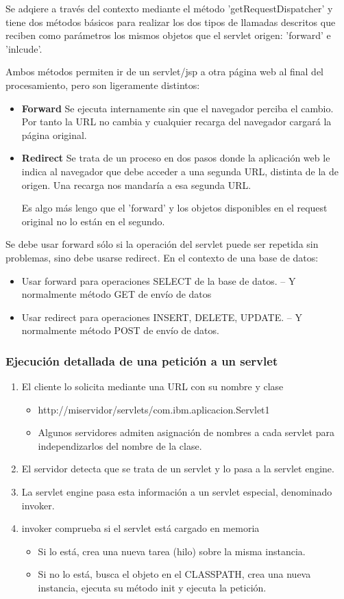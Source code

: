 \documentclass{apuntes}
\begin{document}
Se adqiere a través del contexto mediante el método 'getRequestDispatcher' y tiene dos métodos básicos para realizar los dos tipos de llamadas descritos que reciben como parámetros los mismos objetos que el servlet origen: 'forward' e 'inlcude'.

Ambos métodos permiten ir de un servlet/jsp a otra página web al final del procesamiento, pero son ligeramente distintos:
\begin{itemize}
\item \textbf{Forward}
Se ejecuta internamente sin que el navegador perciba el cambio. Por tanto la URL no cambia y cualquier recarga del navegador cargará la página original.
\item \textbf{Redirect}
Se trata de un proceso en dos pasos donde la aplicación web le indica al navegador que debe acceder a una segunda URL, distinta de la de origen. Una recarga nos mandaría a esa segunda URL.

Es algo más lengo que el 'forward' y los objetos disponibles en el request original no lo están en el segundo.
\end{itemize}

Se debe usar forward sólo si la operación del servlet puede ser repetida sin problemas, sino debe usarse redirect. En el contexto de una base de datos:
\begin{itemize}
\item Usar forward para operaciones SELECT de la base de datos.
– Y normalmente método GET de envío de datos
\item Usar redirect para operaciones INSERT, DELETE, UPDATE.
– Y normalmente método POST de envío de datos.
\end{itemize}

\subsubsection{Ejecución detallada de una petición a un servlet}
\begin{enumerate}
\item El cliente lo solicita mediante una URL con su nombre y clase
\begin{itemize}
\item http://miservidor/servlets/com.ibm.aplicacion.Servlet1
\item Algunos servidores admiten asignación de nombres a cada servlet para independizarlos del nombre de la clase.
\end{itemize}
\item El servidor detecta que se trata de un servlet y lo pasa a la servlet engine.
\item La servlet engine pasa esta información a un servlet especial, denominado invoker.
\item invoker comprueba si el servlet está cargado en memoria
\begin{itemize}
\item Si lo está, crea una nueva tarea (hilo) sobre la misma instancia.
\item Si no lo está, busca el objeto en el CLASSPATH, crea una nueva instancia, ejecuta su método init y ejecuta la petición.
\end{itemize}
\end{enumerate}
\end{document}
